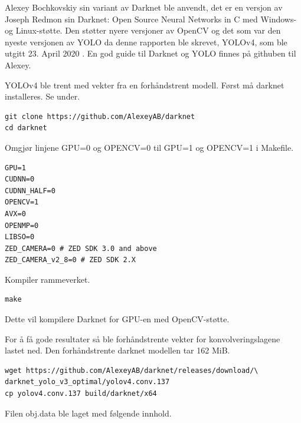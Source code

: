 Alexey Bochkovskiy sin variant av Darknet ble anvendt, det er en versjon av Joseph Redmon sin Darknet: Open Source Neural Networks in C med Windows- og Linux-støtte. Den støtter nyere versjoner av OpenCV og det som var den nyeste versjonen av YOLO da denne rapporten ble skrevet, YOLOv4, som ble utgitt 23. April 2020 \cite{Bochkovskiy m.fl. 2020}. En god guide til Darknet og YOLO finnes på githuben til Alexey. \cite{Bochkovskiy 2020}


YOLOv4 ble trent med vekter fra en forhåndstrent modell. Først må darknet installeres. Se under.

\begin{verbatim}
git clone https://github.com/AlexeyAB/darknet
cd darknet
\end{verbatim}

Omgjør linjene GPU=0 og OPENCV=0 til GPU=1 og OPENCV=1 i Makefile.

\begin{lstlisting}[language={}, caption=De første linjene i Makefile]
GPU=1
CUDNN=0
CUDNN_HALF=0
OPENCV=1
AVX=0
OPENMP=0
LIBSO=0
ZED_CAMERA=0 # ZED SDK 3.0 and above
ZED_CAMERA_v2_8=0 # ZED SDK 2.X
\end{lstlisting}

Kompiler rammeverket.

\begin{verbatim}
make
\end{verbatim}

Dette vil kompilere Darknet for GPU-en med OpenCV-støtte.


For å få gode resultater så ble forhåndstrente vekter for konvolveringslagene lastet ned. Den forhåndstrente darknet modellen tar 162 MiB.

\begin{verbatim}
wget https://github.com/AlexeyAB/darknet/releases/download/\
darknet_yolo_v3_optimal/yolov4.conv.137
cp yolov4.conv.137 build/darknet/x64
\end{verbatim}

Filen obj.data ble laget med følgende innhold.

